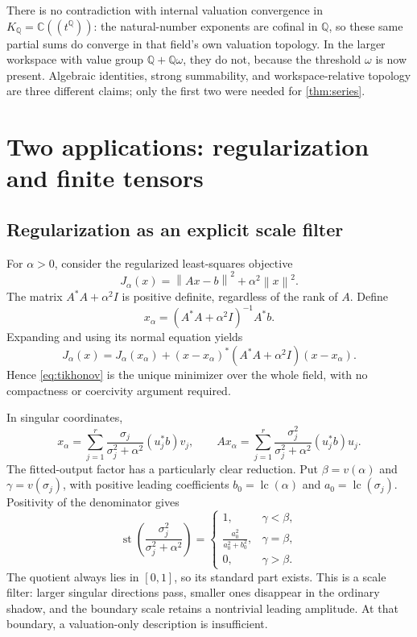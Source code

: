\documentclass[11pt,a4paper]{article}
\numberwithin{equation}{section}
\theoremstyle{definition}
\theoremstyle{remark}
\newcommand{\C}{\mathbb C}
\newcommand{\Q}{\mathbb Q}
\newcommand{\st}{\operatorname{st}}
\newcommand{\lc}{\operatorname{lc}}
\newcommand{\norm}[1]{\left\lVert#1\right\rVert}
\begin{document}
There is no contradiction with internal valuation convergence in
$K_\Q=\C((t^\Q))$: the natural-number exponents are cofinal in $\Q$, so
these same partial sums do converge in that field's own valuation topology.
In the larger workspace with value group $\Q+\Q\omega$, they do not,
because the threshold $\omega$ is now present. Algebraic identities,
strong summability, and workspace-relative topology are three different
claims; only the first two were needed for \cref{thm:series}.

\section{Two applications: regularization and finite tensors}\label{sec:applications}

\subsection{Regularization as an explicit scale filter}
For $\alpha>0$, consider the regularized least-squares objective
\[
 J_\alpha(x)=\norm{Ax-b}^2+\alpha^2\norm x^2.
\]
The matrix $A^*A+\alpha^2I$ is positive definite, regardless of the rank of
$A$. Define
\begin{equation}\label{eq:tikhonov}
 x_\alpha=(A^*A+\alpha^2I)^{-1}A^*b.
\end{equation}
Expanding and using its normal equation yields
\[
 J_\alpha(x)=J_\alpha(x_\alpha)
 +(x-x_\alpha)^*(A^*A+\alpha^2I)(x-x_\alpha).
\]
Hence \eqref{eq:tikhonov} is the unique minimizer over the whole field, with
no compactness or coercivity argument required.

In singular coordinates,
\begin{equation}\label{eq:filters}
 x_\alpha=\sum_{j=1}^r
    \frac{\sigma_j}{\sigma_j^2+\alpha^2}(u_j^*b)v_j,
 \qquad
 Ax_\alpha=\sum_{j=1}^r
    \frac{\sigma_j^2}{\sigma_j^2+\alpha^2}(u_j^*b)u_j.
\end{equation}
The fitted-output factor has a particularly clear reduction. Put
$\beta=v(\alpha)$ and $\gamma=v(\sigma_j)$, with positive leading
coefficients $b_0=\lc(\alpha)$ and $a_0=\lc(\sigma_j)$. Positivity of
the denominator gives
\begin{equation}\label{eq:regscale}
 \st\left(\frac{\sigma_j^2}{\sigma_j^2+\alpha^2}\right)
 =\begin{cases}
  1,&\gamma<\beta,\\
  \displaystyle\frac{a_0^2}{a_0^2+b_0^2},&\gamma=\beta,\\
  0,&\gamma>\beta.
 \end{cases}
\end{equation}
The quotient always lies in $[0,1]$, so its standard part exists. This is a
scale filter: larger singular directions pass, smaller ones disappear in
the ordinary shadow, and the boundary scale retains a nontrivial leading
amplitude. At that boundary, a valuation-only description is insufficient.
\end{document}
